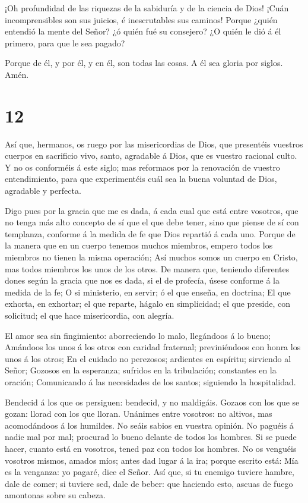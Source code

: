  ¡Oh profundidad de las riquezas de la sabiduría y de la
ciencia de Dios! ¡Cuán incomprensibles son sus juicios, é inescrutables
sus caminos!  Porque ¿quién entendió la mente del Señor? ¿ó
quién fué su consejero?  ¿O quién le dió á él primero, para
que le sea pagado?

 Porque de él, y por él, y en él, son todas las cosas. A él
sea gloria por siglos. Amén.

\hypertarget{section-11}{%
\section{12}\label{section-11}}

 Así que, hermanos, os ruego por las misericordias de Dios,
que presentéis vuestros cuerpos en sacrificio vivo, santo, agradable á
Dios, que es vuestro racional culto.  Y no os conforméis á
este siglo; mas reformaos por la renovación de vuestro entendimiento,
para que experimentéis cuál sea la buena voluntad de Dios, agradable y
perfecta.

 Digo pues por la gracia que me es dada, á cada cual que
está entre vosotros, que no tenga más alto concepto de sí que el que
debe tener, sino que piense de sí con templanza, conforme á la medida de
fe que Dios repartió á cada uno.  Porque de la manera que en
un cuerpo tenemos muchos miembros, empero todos los miembros no tienen
la misma operación;  Así muchos somos un cuerpo en Cristo,
mas todos miembros los unos de los otros.  De manera que,
teniendo diferentes dones según la gracia que nos es dada, si el de
profecía, úsese conforme á la medida de la fe;  O si
ministerio, en servir; ó el que enseña, en doctrina;  El que
exhorta, en exhortar; el que reparte, hágalo en simplicidad; el que
preside, con solicitud; el que hace misericordia, con alegría.

 El amor sea sin fingimiento: aborreciendo lo malo,
llegándoos á lo bueno;  Amándoos los unos á los otros con
caridad fraternal; previniéndoos con honra los unos á los otros;
 En el cuidado no perezosos; ardientes en espíritu;
sirviendo al Señor;  Gozosos en la esperanza; sufridos en
la tribulación; constantes en la oración;  Comunicando á
las necesidades de los santos; siguiendo la hospitalidad.

 Bendecid á los que os persiguen: bendecid, y no maldigáis.
 Gozaos con los que se gozan: llorad con los que lloran.
 Unánimes entre vosotros: no altivos, mas acomodándoos á
los humildes. No seáis sabios en vuestra opinión.  No
paguéis á nadie mal por mal; procurad lo bueno delante de todos los
hombres.  Si se puede hacer, cuanto está en vosotros, tened
paz con todos los hombres.  No os venguéis vosotros mismos,
amados míos; antes dad lugar á la ira; porque escrito está: Mía es la
venganza: yo pagaré, dice el Señor.  Así que, si tu enemigo
tuviere hambre, dale de comer; si tuviere sed, dale de beber: que
haciendo esto, ascuas de fuego amontonas sobre su cabeza.

